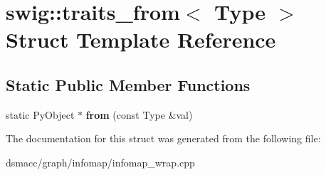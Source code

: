 \hypertarget{structswig_1_1traits__from}{}\section{swig\+:\+:traits\+\_\+from$<$ Type $>$ Struct Template Reference}
\label{structswig_1_1traits__from}
\subsection*{Static Public Member Functions}
\begin{DoxyCompactItemize}
\item 
\mbox{\label{structswig_1_1traits__from_a502976b6bea889bcc35d0aed72e8d901}} 
static Py\+Object $\ast$ {\bfseries from} (const Type \&val)
\end{DoxyCompactItemize}


The documentation for this struct was generated from the following file\+:\begin{DoxyCompactItemize}
\item 
dsmacc/graph/infomap/infomap\+\_\+wrap.\+cpp\end{DoxyCompactItemize}
